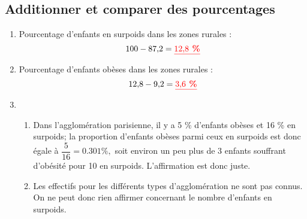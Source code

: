 \documentclass[12pt,a4paper]{article}
\begin{document}
\begin{myexs}

\end{myexs}

\subsection{Additionner et comparer des pourcentages}

\begin{enumerate}[label=\arabic*.]
	\item Pourcentage d'enfants en surpoids dans les zones rurales :
	\begin{equation*}
		\num{100} - \num{87.2} = \textcolor{red}{\underline{\textbf{\num{12.8}  \%}}}
	\end{equation*}
	
	\item Pourcentage d'enfants obèses dans les zones rurales :
	\begin{equation*}
		\num{12.8} - \num{9.2} = \textcolor{red}{\underline{\textbf{\num{3.6}  \%}}}
	\end{equation*}
	
	\item \begin{enumerate}[label=\alph*)]
		\item Dans l'agglomération parisienne, il y a \num{5} \% d'enfants obèses et \num{16} \% en surpoids; la proportion d'enfants obèses parmi ceux en surpoids est donc égale à $\dfrac{5}{16}=\num{0.301} \%,$ soit environ un peu plus de 3 enfants souffrant d'obésité pour 10 en surpoids. L'affirmation est donc juste.
		
		\item Les effectifs pour les différents types d'agglomération ne sont pas connus. On ne peut donc rien affirmer concernant le nombre d'enfants en surpoids.
	\end{enumerate}
\end{enumerate}

\begin{myexs}
\end{myexs}
\end{document}
